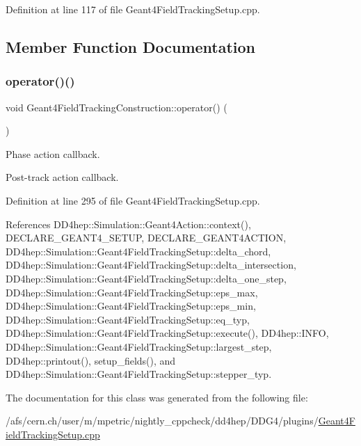Definition at line 117 of file Geant4\+Field\+Tracking\+Setup.\+cpp.



\subsection{Member Function Documentation}
\hypertarget{class_d_d4hep_1_1_simulation_1_1_geant4_field_tracking_construction_adcd59c071e92490f8fd37423d74f542a}{}\label{class_d_d4hep_1_1_simulation_1_1_geant4_field_tracking_construction_adcd59c071e92490f8fd37423d74f542a} 
\subsubsection{\texorpdfstring{operator()()}{operator()()}}
{\footnotesize\ttfamily void Geant4\+Field\+Tracking\+Construction\+::operator() (\begin{DoxyParamCaption}{ }\end{DoxyParamCaption})}



Phase action callback. 

Post-\/track action callback. 

Definition at line 295 of file Geant4\+Field\+Tracking\+Setup.\+cpp.



References D\+D4hep\+::\+Simulation\+::\+Geant4\+Action\+::context(), D\+E\+C\+L\+A\+R\+E\+\_\+\+G\+E\+A\+N\+T4\+\_\+\+S\+E\+T\+UP, D\+E\+C\+L\+A\+R\+E\+\_\+\+G\+E\+A\+N\+T4\+A\+C\+T\+I\+ON, D\+D4hep\+::\+Simulation\+::\+Geant4\+Field\+Tracking\+Setup\+::delta\+\_\+chord, D\+D4hep\+::\+Simulation\+::\+Geant4\+Field\+Tracking\+Setup\+::delta\+\_\+intersection, D\+D4hep\+::\+Simulation\+::\+Geant4\+Field\+Tracking\+Setup\+::delta\+\_\+one\+\_\+step, D\+D4hep\+::\+Simulation\+::\+Geant4\+Field\+Tracking\+Setup\+::eps\+\_\+max, D\+D4hep\+::\+Simulation\+::\+Geant4\+Field\+Tracking\+Setup\+::eps\+\_\+min, D\+D4hep\+::\+Simulation\+::\+Geant4\+Field\+Tracking\+Setup\+::eq\+\_\+typ, D\+D4hep\+::\+Simulation\+::\+Geant4\+Field\+Tracking\+Setup\+::execute(), D\+D4hep\+::\+I\+N\+FO, D\+D4hep\+::\+Simulation\+::\+Geant4\+Field\+Tracking\+Setup\+::largest\+\_\+step, D\+D4hep\+::printout(), setup\+\_\+fields(), and D\+D4hep\+::\+Simulation\+::\+Geant4\+Field\+Tracking\+Setup\+::stepper\+\_\+typ.



The documentation for this class was generated from the following file\+:\begin{DoxyCompactItemize}
\item 
/afs/cern.\+ch/user/m/mpetric/nightly\+\_\+cppcheck/dd4hep/\+D\+D\+G4/plugins/\hyperlink{_geant4_field_tracking_setup_8cpp}{Geant4\+Field\+Tracking\+Setup.\+cpp}\end{DoxyCompactItemize}
